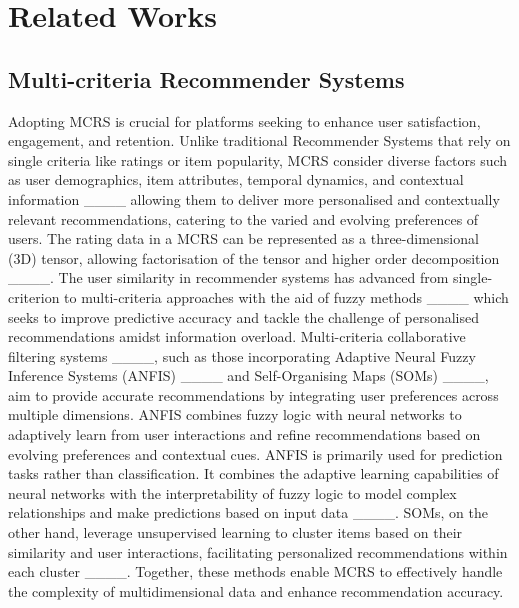 \section{Related Works}
\subsection{Multi-criteria Recommender Systems}

    Adopting MCRS is crucial for platforms seeking to enhance user satisfaction, engagement, and retention. Unlike traditional Recommender Systems  that rely on single criteria like ratings or item popularity, MCRS consider diverse factors such as user demographics, item attributes, temporal dynamics, and contextual information ____ allowing them  to deliver more personalised and contextually relevant recommendations, catering to the varied and evolving preferences of users. The rating data in a MCRS can be represented as a three-dimensional (3D) tensor, allowing factorisation of the tensor and higher order decomposition ____. The user similarity in recommender systems has advanced from single-criterion to multi-criteria approaches with the aid of fuzzy methods ____ which seeks to improve predictive accuracy and tackle the challenge of personalised recommendations amidst information overload. Multi-criteria collaborative filtering systems ____, such as those incorporating Adaptive Neural Fuzzy Inference Systems (ANFIS) ____ and Self-Organising Maps (SOMs) ____, aim to provide accurate recommendations by integrating user preferences across multiple dimensions. ANFIS combines fuzzy logic with neural networks to adaptively learn from user interactions and refine recommendations based on evolving preferences and contextual cues. ANFIS is primarily used for prediction tasks rather than classification. It combines the adaptive learning capabilities of neural networks with the interpretability of fuzzy logic to model complex relationships and make predictions based on input data ____. SOMs, on the other hand, leverage unsupervised learning to cluster items based on their similarity and user interactions, facilitating personalized recommendations within each cluster ____. Together, these methods enable MCRS to effectively handle the complexity of multidimensional data and enhance recommendation accuracy.
    
